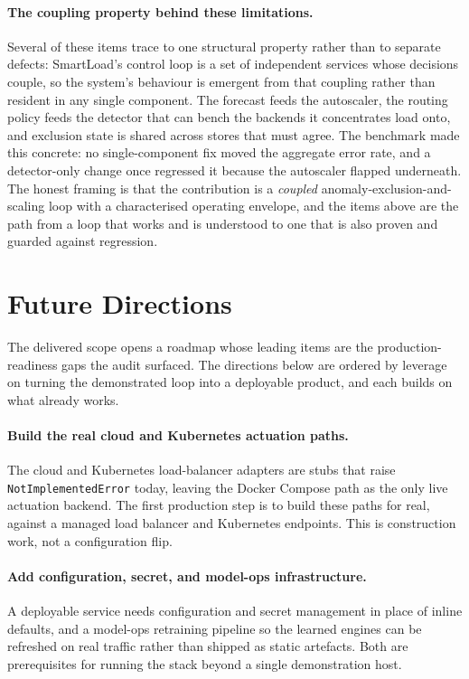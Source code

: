 \paragraph{The coupling property behind these limitations.} Several of these items trace
to one structural property rather than to separate defects: SmartLoad's control loop is a
set of independent services whose decisions couple, so the system's behaviour is emergent
from that coupling rather than resident in any single component. The forecast feeds the
autoscaler, the routing policy feeds the detector that can bench the backends it
concentrates load onto, and exclusion state is shared across stores that must agree. The
benchmark made this concrete: no single-component fix moved the aggregate error rate, and
a detector-only change once regressed it because the autoscaler flapped underneath. The
honest framing is that the contribution is a \emph{coupled}
anomaly-exclusion-and-scaling loop with a characterised operating envelope, and the items
above are the path from a loop that works and is understood to one that is also proven and
guarded against regression.

\section{Future Directions}
\label{conc:future}

The delivered scope opens a roadmap whose leading items are the production-readiness gaps
the audit surfaced. The directions below are ordered by leverage on turning the
demonstrated loop into a deployable product, and each builds on what already works.

\paragraph{Build the real cloud and Kubernetes actuation paths.} The cloud and
Kubernetes load-balancer adapters are stubs that raise \texttt{NotImplementedError}
today, leaving the Docker Compose path as the only live actuation backend. The first
production step is to build these paths for real, against a managed load balancer and
Kubernetes endpoints. This is construction work, not a configuration flip.

\paragraph{Add configuration, secret, and model-ops infrastructure.} A deployable service
needs configuration and secret management in place of inline defaults, and a model-ops
retraining pipeline so the learned engines can be refreshed on real traffic rather than
shipped as static artefacts. Both are prerequisites for running the stack beyond a single
demonstration host.

